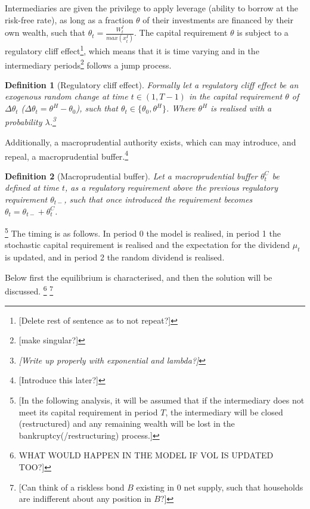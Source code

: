 \documentclass[11pt]{article}
\newtheorem{definition}{Definition}%
\begin{document}
Intermediaries are given the privilege to apply leverage (ability to borrow at the risk-free rate), as long as a fraction $\theta$ of their investments are financed by their own wealth, such that $\theta_t = \frac{W^I_t}{max(x^{I}_t)}$. The capital requirement $\theta$ is subject to a regulatory cliff effect\footnote{[Delete rest of sentence as to not repeat?]}, which means that it is time varying and in the intermediary periods\footnote{[make singular?]} follows a jump process. 

\begin{definition}[Regulatory cliff effect] Formally let a regulatory cliff effect be an exogenous random change at time $t \in (1,T-1)$ in the capital requirement $\theta$ of $\Delta \theta_t$ ($\Delta \theta_t =  \theta^H-\theta_0$), such that $\theta_t \in \{\theta_0,\theta^H\}$. Where $\theta^H$ is realised with a probability $\lambda$.\footnote{[Write up properly with exponential and lambda?]}
\end{definition}

Additionally, a macroprudential authority exists, which can may introduce, and repeal, a macroprudential buffer.\footnote{[Introduce this later?]}

\begin{definition}[Macroprudential buffer]
Let a macroprudential buffer $\theta^C_t$ be defined at time $t$, as a regulatory requirement above the previous regulatory requirement $\theta_{t-}$, such that once introduced the requirement becomes $\theta_t = \theta_{t-} + \theta^C_t$.
\end{definition}


\footnote{[In the following analysis, it will be assumed that if the intermediary does not meet its capital requirement in period $T$, the intermediary will be closed (restructured) and any remaining wealth will be lost in the bankruptcy(/restructuring) process.]} The timing is as follows. In period 0 the model is realised, in period 1  the stochastic capital requirement is realised and the expectation for the dividend $\mu_t$ is updated, and in period 2 the random dividend is realised.

Below first the equilibrium is characterised, and then the solution will be discussed.
\footnote{WHAT WOULD HAPPEN IN THE MODEL IF VOL IS UPDATED TOO?]}
\footnote{[Can think of a riskless bond $B$ existing in 0 net supply, such that households are indifferent about any position in $B$?]}

\end{document}
